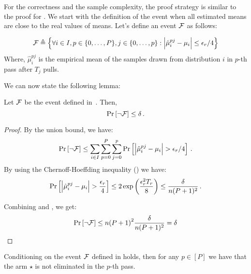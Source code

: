 For the correctness and the sample complexity, the proof strategy is similar to the proof for . 
We start with the definition of the event when all estimated means are close to the real values of means. Let's define an event \(\mathcal{F}\) as follows:

\begin{align}\label{eq:event-F}
	\mathcal{F} \triangleq \left\{\forall{i \in I}, p \in \{0, \dotsc, P\}, j \in \{0, \dotsc, p\} : \left| \hat\mu^{pj}_i - \mu_i \right| \le \epsilon_r / 4\right\}
\end{align}
Where, \(\hat\mu^{pj}_i\) is the empirical mean of the samples drawn from distribution \(i\) in \(p\)-th pass after \(T_j\) pulls. 

We can now state the following lemma: 

\begin{lemma}\label{lem:bound-F}
	Let \(\mathcal{F}\) be the event defined in~. Then, \[\operatorname*{\textnormal{Pr}}\left[ \neg \mathcal{F}\right] \le \delta\,. \]
\end{lemma}
\begin{proof}
	By the union bound, we have:
	\begin{align}\label{eq:event-F-sum}
		\operatorname*{\textnormal{Pr}}\left[\neg \mathcal{F}\right] \le \sum_{i \in I} \sum_{p = 0}^{P} \sum_{j = 0}^{p} \operatorname*{\textnormal{Pr}}\left[\left| \hat{\mu}^{pj}_i - \mu_i \right| > \epsilon_r/4\right]\,.
	\end{align}
	By using the Chernoff-Hoeffding inequality () we have: 
	\begin{align}\label{eq:event-F-term}
		\operatorname*{\textnormal{Pr}}\left[\left| \hat\mu^{pj}_i-\mu_i \right| > \frac{\epsilon_r}{4}\right] \leq 2\exp\left(\frac{\epsilon^2_r T_r}{8}\right) \leq \frac{\delta}{n(P + 1)^2}\,.
	\end{align}
	
	Combining  and , we get: 
	\begin{align*}
		\operatorname*{\textnormal{Pr}}\left[\neg \mathcal{F}\right] \le n {(P + 1)}^2 \frac{\delta}{n(P + 1)^2} = \delta
	\end{align*}
\end{proof}


\begin{lemma}\label{lem:improved-best}
	 Conditioning on the event \(\mathcal{F}\) defined in  holds, then for any \(p \in [P]\) we have that the arm \(\star\) is not eliminated in the \(p\)-th pass. 
\end{lemma}

